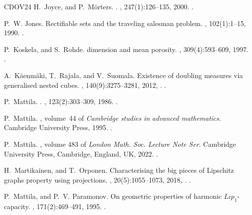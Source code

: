 \documentclass[11pt,reqno]{amsart}
\theoremstyle{definition}
\theoremstyle{remark}
\numberwithin{equation}{section}
\theoremstyle{theorem}
\theoremstyle{definition}
\theoremstyle{remark}
\numberwithin{equation}{section}
\begin{document}
\begin{thebibliography}{CDOV24}
	H.~Joyce, and P.~M{\"o}rters.
	.
	, 247(1):126--135, 2000.
	\newblock {}.
	
	P.~W. Jones.
	\newblock Rectifiable sets and the traveling salesman problem.
	, 102(1):1--15, 1990.
	\newblock {}.
	
	P.~Koskela, and S.~Rohde.
	 dimension and mean porosity.
	, 309(4):593--609, 1997.
	\newblock {}.
	
	A.~K{\"a}enm{\"a}ki, T.~Rajala, and V.~Suomala.
	\newblock Existence of doubling measures via generalised nested cubes.
	, 140(9):3275--3281, 2012,
	.
	\newblock {}.
	
	P.~Mattila.
	.
	, 123(2):303--309, 1986.
	\newblock {}.
	
	P.~Mattila.
	, volume~44 of {\em Cambridge studies in advanced
		mathematics}.
	\newblock Cambridge University Press, 1995.
	\newblock {}.
	
	P.~Mattila.
	, volume 483 of {\em London Math.
		Soc. Lecture Note Ser.}
	\newblock Cambridge University Press, Cambridge, England, UK, 2022.
	\newblock {}.
	
	H.~Martikainen, and T.~Orponen.
	\newblock Characterising the big pieces of {Lipschitz} graphs property using
	projections.
	, 20(5):1055--1073, 2018,
	.
	\newblock {}.
	
	P.~Mattila, and P.~V. Paramonov.
	\newblock On geometric properties of harmonic {$Lip_1$}-capacity.
	, 171(2):469--491, 1995.
	\newblock {}.
	

\end{thebibliography}
\end{document}
